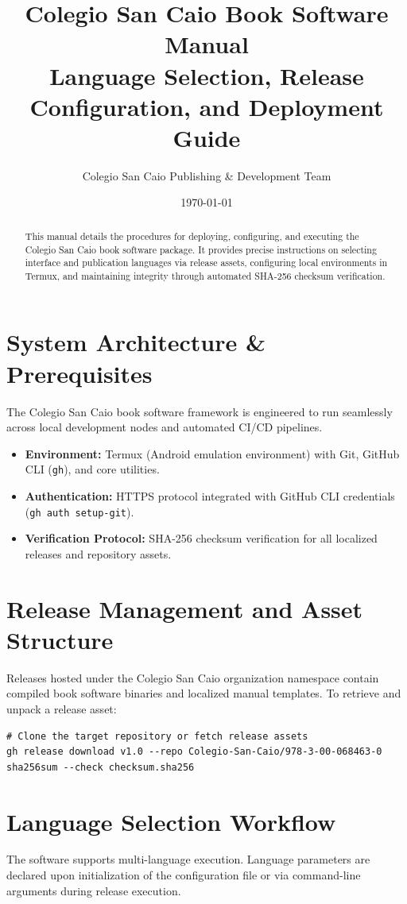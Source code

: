 \documentclass[11pt, a4paper]{article}
\title{\textbf{Colegio San Caio Book Software Manual}\\\large Language Selection, Release Configuration, and Deployment Guide}
\author{Colegio San Caio Publishing \& Development Team}
\date{\today}
\begin{document}
\maketitle

\begin{abstract}
This manual details the procedures for deploying, configuring, and executing the Colegio San Caio book software package. It provides precise instructions on selecting interface and publication languages via release assets, configuring local environments in Termux, and maintaining integrity through automated SHA-256 checksum verification.
\end{abstract}

\section{System Architecture \& Prerequisites}
The Colegio San Caio book software framework is engineered to run seamlessly across local development nodes and automated CI/CD pipelines. 

\begin{itemize}
    \item \textbf{Environment:} Termux (Android emulation environment) with Git, GitHub CLI (\texttt{gh}), and core utilities.
    \item \textbf{Authentication:} HTTPS protocol integrated with GitHub CLI credentials (\texttt{gh auth setup-git}).
    \item \textbf{Verification Protocol:} SHA-256 checksum verification for all localized releases and repository assets.
\end{itemize}

\section{Release Management and Asset Structure}
Releases hosted under the Colegio San Caio organization namespace contain compiled book software binaries and localized manual templates. To retrieve and unpack a release asset:

\begin{verbatim}
# Clone the target repository or fetch release assets
gh release download v1.0 --repo Colegio-San-Caio/978-3-00-068463-0
sha256sum --check checksum.sha256
\end{verbatim}

\section{Language Selection Workflow}
The software supports multi-language execution. Language parameters are declared upon initialization of the configuration file or via command-line arguments during release execution.
\end{document}
